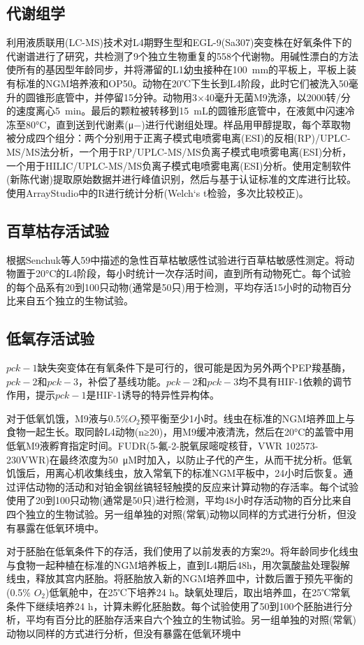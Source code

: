\documentclass{ctexart}
\begin{document}
        \subsection{代谢组学}

        利用液质联用(LC-MS)技术对L4期野生型和EGL-9(Sa307)突变株在好氧条件下的代谢谱进行了研究，共检测了9个独立生物重复的558个代谢物。用碱性漂白的方法使所有的基因型年龄同步，并将滞留的L1幼虫接种在100~mm的平板上，平板上装有标准的NGM培养液和OP50。动物在20℃下生长到L4阶段，此时它们被洗入50毫升的圆锥形底管中，并停留15分钟。动物用3×40毫升无菌M9洗涤，以2000转/分的速度离心5~min。最后的颗粒被转移到15~mL的圆锥形底管中，在液氮中闪速冷冻至80°C，直到送到代谢素(μ−)进行代谢组处理。样品用甲醇提取，每个萃取物被分成四个组分：两个分别用于正离子模式电喷雾电离(ESI)的反相(RP)/UPLC-MS/MS法分析，一个用于RP/UPLC-MS/MS负离子模式电喷雾电离(ESI)分析，一个用于HILIC/UPLC-MS/MS负离子模式电喷雾电离(ESI)分析。使用定制软件(新陈代谢)提取原始数据并进行峰值识别，然后与基于认证标准的文库进行比较。使用ArrayStudio中的R进行统计分析(Welch‘s t检验，多次比较校正)。

        \subsection{百草枯存活试验}
        
        根据Senchuk等人59中描述的急性百草枯敏感性试验进行百草枯敏感性测定。将动物置于20°C的L4阶段，每小时统计一次存活时间，直到所有动物死亡。每个试验的每个品系有20到100只动物(通常是50只)用于检测，平均存活15小时的动物百分比来自五个独立的生物试验。

        \subsection{低氧存活试验}

        $pck-1$缺失突变体在有氧条件下是可行的，很可能是因为另外两个PEP羧基酶，$pck-2$和$pck-3$，补偿了基线功能。$pck-2$和$pck-3$均不具有HIF-1依赖的调节作用，提示$pck-1$是HIF-1诱导的特异性异构体。

        对于低氧饥饿，M9液与0.5\%$O_2$预平衡至少1小时。线虫在标准的NGM培养皿上与食物一起生长。取同龄L4动物(n≥20)，用M9缓冲液清洗，然后在20°C的盖管中用低氧M9液孵育指定时间。FUDR(5-氟-2-脱氧尿嘧啶核苷，VWR 102573-230VWR)在最终浓度为50~μM时加入，以防止子代的产生，从而干扰分析。低氧饥饿后，用离心机收集线虫，放入常氧下的标准NGM平板中，24小时后恢复。通过评估动物的活动和对铂金钢丝镐轻轻触摸的反应来计算动物的存活率。每个试验使用了20到100只动物(通常是50只)进行检测，平均48小时存活动物的百分比来自四个独立的生物试验。另一组单独的对照(常氧)动物以同样的方式进行分析，但没有暴露在低氧环境中。

        对于胚胎在低氧条件下的存活，我们使用了以前发表的方案29。将年龄同步化线虫与食物一起种植在标准的NGM培养板上，直到L4期后48h，用次氯酸盐处理裂解线虫，释放其宫内胚胎。将胚胎放入新的NGM培养皿中，计数后置于预先平衡的(0.5\% $O_2$)低氧舱中，在25℃下培养24 h。缺氧处理后，取出培养皿，在25℃常氧条件下继续培养24 h，计算未孵化胚胎数。每个试验使用了50到100个胚胎进行分析，平均有百分比的胚胎存活来自六个独立的生物试验。另一组单独的对照(常氧)动物以同样的方式进行分析，但没有暴露在低氧环境中
\end{document}
